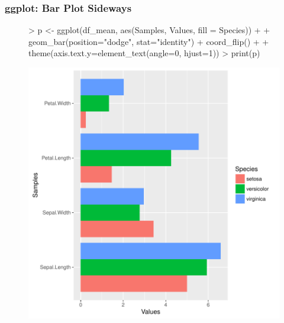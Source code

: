 \documentclass{beamer}
\begin{document}
\begin{frame}[containsverbatim]  
	\frametitle{ggplot: Bar Plot Sideways}
\scriptsize 
\begin{figure}
  \centering
\begin{Schunk}
\begin{Sinput}
> p <- ggplot(df_mean, aes(Samples, Values, fill = Species)) + 
+             geom_bar(position="dodge", stat="identity") + coord_flip() + 
+             theme(axis.text.y=element_text(angle=0, hjust=1))
> print(p) 
\end{Sinput}
\end{Schunk}
\includegraphics{fig--058}
\label{fig:qplotscatter}
\end{figure}
\end{frame}
\end{document}
